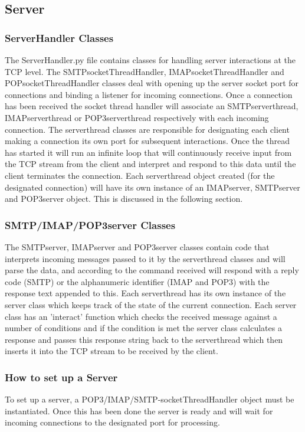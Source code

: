 \documentclass[11pt]{article}
\begin{document}
\begin{multicols}{2}
\subsection{Server}
\subsubsection{ServerHandler Classes}
The ServerHandler.py file contains classes for handling server interactions at the TCP level. The SMTPsocketThreadHandler, IMAPsocketThreadHandler and POPsocketThreadHandler classes deal with opening up the server socket port for connections and binding a listener for incoming connections. Once a connection has been received  the socket thread handler will associate an SMTPserver\textunderscore thread, IMAPserver\textunderscore thread or POP3server\textunderscore thread respectively with each incoming connection. The server\textunderscore thread classes are responsible for designating each client making a connection its own port for subsequent interactions. Once the thread has started it will run an infinite loop that will continuously receive input from the TCP stream from the client and interpret and respond to this data until the client terminates the connection. Each server\textunderscore thread object created (for the designated connection) will have its own instance of an IMAPserver, SMTPserver and POP3server object. This is discussed in the following section. 
\subsubsection{SMTP/IMAP/POP3server Classes}
The SMTPserver, IMAPserver and POP3server classes contain code that interprets incoming messages passed to it by the server\textunderscore thread classes and will parse the data, and according to the command received will respond with a reply code (SMTP) or the alphanumeric identifier (IMAP and POP3) with the response text appended to this. Each server\textunderscore thread has its own instance of the server class which keeps track of the state of the current connection. Each server class has an 'interact' function which checks the received message against a number of conditions and if the condition is met the server class calculates a response and passes this response string back to the server\textunderscore thread which then inserts it into the TCP stream to be received by the client.

\subsubsection{How to set up a Server}
To set up a server, a POP3/IMAP/SMTP-socketThreadHandler object must be instantiated. Once this has been done the server is ready and will wait for incoming connections to the designated port for processing.


\end{multicols}
\end{document}
